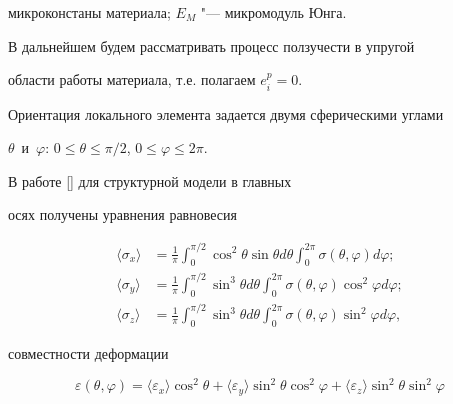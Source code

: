 микроконстаны материала;  $E_M$ "--- микромодуль Юнга.



В дальнейшем будем рассматривать  процесс ползучести в упругой

области работы материала, т.е. полагаем $e^p_i=0$.



Ориентация локального элемента задается двумя сферическими углами

$\theta$~и~$\varphi$: $0\le\theta\le\pi/2$,   $0\le\varphi\le 2\pi$.



В работе [] для структурной модели в главных

осях получены уравнения равновесия

\begin{equation}

\label{nebogina:eq:2}

\begin{aligned}

\langle\sigma_x\rangle&=\frac1\pi \int _0^{\pi/2}

\cos^2\theta \sin\theta d\theta

\int _0^{2\pi}\sigma(\theta,\varphi) d\varphi;\\

\langle\sigma_y\rangle&=\frac1\pi \int _0^{\pi/2}

\sin^3\theta d\theta

 \int _0^{2\pi}\sigma(\theta,\varphi) \cos^2\varphi d\varphi;\\

\langle\sigma_z\rangle&=\frac1\pi \int _0^{\pi/2}

\sin^3\theta d\theta \int _0^{2\pi}\sigma(\theta,\varphi)

\sin^2\varphi d\varphi,

\end{aligned}

\end{equation}

совместности деформации

\begin{equation}

\label{nebogina:eq:4}

 \varepsilon (\theta,\varphi) =

\langle\varepsilon_x\rangle \cos^2\theta +

\langle\varepsilon_y\rangle \sin^2\theta \cos^2\varphi +

\langle\varepsilon_z\rangle \sin^2\theta \sin^2\varphi

\end{equation}

